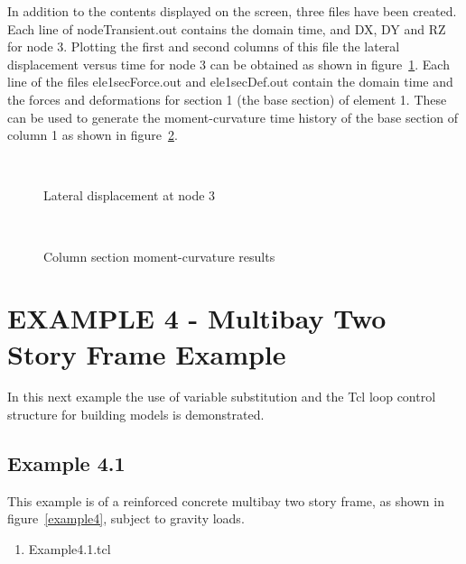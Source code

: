 \documentclass[12pt]{article}
\begin{document}
In addition to the contents displayed on the screen, three files have been
created. Each line of nodeTransient.out contains the domain
time, and DX, DY and RZ for node 3. Plotting the first and second
columns of this file the lateral displacement versus time for node 3
can be obtained as shown in figure~\ref{lateral33}. Each line of the files
ele1secForce.out and ele1secDef.out contain the domain time and the
forces and deformations for section 1 (the base section) of element
1. These can be used to generate the moment-curvature time history of
the base section of column 1 as shown in figure~\ref{element1MK}.



\begin{figure}[htpb]
\begin{center}
\leavevmode
\hbox{%
\epsfxsize=6.0in
}
\end{center}
\caption{Lateral displacement at node 3}
\label{lateral33}
\end{figure}

\begin{figure}[htpb]
\begin{center}
\leavevmode
\hbox{%
\epsfxsize=6.25in
}
\end{center}
\caption{Column section moment-curvature results}
\label{element1MK}
\end{figure}


\pagebreak
\pagebreak

\section {EXAMPLE 4 - Multibay Two Story Frame Example}

In this next example the use of variable substitution and the Tcl loop
control structure for building models is demonstrated.

\subsection{Example 4.1}
This example is of a reinforced concrete multibay two story
frame, as shown in figure~\ref{example4}, subject to gravity loads. 


\vspace{0.2in}  
\begin{enumerate} 
\item Example4.1.tcl
\end{enumerate}
\end{document}
